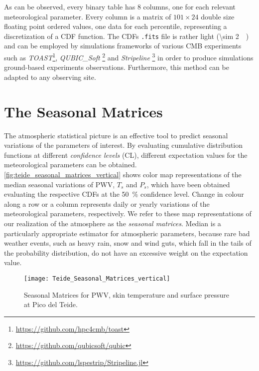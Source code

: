 As can be observed, every binary table has \num{8} columns, one for each
relevant meteorological parameter. Every column is a matrix of $101 \times
24$ double size floating point ordered values, one data for each
percentile, representing a discretization of a CDF function.  The CDFs
\texttt{.fits} file is rather light (\SI{\sim 2}{\mega\byte}) and can be
employed by simulations frameworks of various CMB experiments such as
\emph{TOAST}\footnote{\url{https://github.com/hpc4cmb/toast}},
\emph{QUBIC\_Soft} \footnote{\url{https://github.com/qubicsoft/qubic}} and
\emph{Stripeline}
\footnote{\url{https://github.com/lspestrip/Stripeline.jl}} in order to
produce simulations ground-based experiments observations. Furthermore,
this method can be adapted to any observing site.

\section{The Seasonal Matrices}

The atmospheric statistical picture is an effective tool to
predict seasonal variations of the parameters of interest. By evaluating
cumulative distribution functions at different \emph{confidence levels}
(CL), different expectation values for the meteorological parameters can be
obtained. \autoref{fig:teide_seasonal_matrices_vertical} shows color map
representations of the median seasonal variations of PWV, $T_s$ and $P_s$,
which have been obtained evaluating the respective CDFs at the
\SI{50}{\percent} confidence level. Change in colour along a row
or a column represents daily or yearly variations of the meteorological
parameters, respectively. We refer to these map representations of our
realization of the atmosphere as the \emph{seasonal matrices}. Median
is a particularly appropriate estimator for atmospheric parameters, because
rare bad weather events, such as heavy rain, snow and wind guts, which
fall in the tails of the probability distribution, do not have an excessive
weight on the expectation value.


\begin{figure}
        \centering
        \texttt{[image: Teide\_Seasonal\_Matrices\_vertical]}
        \caption{Seasonal Matrices for PWV, skin temperature and surface
        pressure at Pico del Teide.}
        \label{fig:teide_seasonal_matrices_vertical}
\end{figure}

